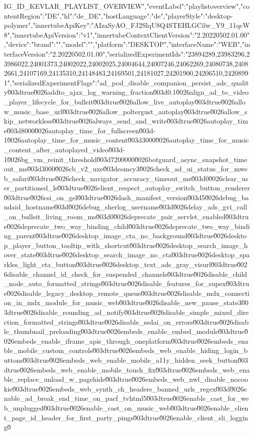 {IG_ID_KEVLAR_PLAYLIST_OVERVIEW","eventLabel":"playlistoverview","contentRegion":"DE","hl":"de_DE","hostLanguage":"de","playerStyle":"desktop-polymer","innertubeApiKey":"AIzaSyAO_FJ2SlqU8Q4STEHLGCilw_Y9_11qcW8","innertubeApiVersion":"v1","innertubeContextClientVersion":"2.20220502.01.00","device":{"brand":"","model":"","platform":"DESKTOP","interfaceName":"WEB","interfaceVersion":"2.20220502.01.00"},"serializedExperimentIds":"23894289,23983296,23986022,24001373,24002022,24002025,24004644,24007246,24062269,24080738,24082661,24107169,24135310,24148483,24169501,24181027,24201900,24206510,24208991","serializedExperimentFlags":"ad_pod_disable_companion_persist_ads_quality\u003dtrue\u0026addto_ajax_log_warning_fraction\u003d0.1\u0026align_ad_to_video_player_lifecycle_for_bulleit\u003dtrue\u0026allow_live_autoplay\u003dtrue\u0026allow_music_base_url\u003dtrue\u0026allow_poltergust_autoplay\u003dtrue\u0026allow_skip_networkless\u003dtrue\u0026always_send_and_write\u003dtrue\u0026autoplay_time\u003d8000\u0026autoplay_time_for_fullscreen\u003d-1\u0026autoplay_time_for_music_content\u003d3000\u0026autoplay_time_for_music_content_after_autoplayed_video\u003d-1\u0026bg_vm_reinit_threshold\u003d7200000\u0026botguard_async_snapshot_timeout_ms\u003d3000\u0026cb_v2_uxe\u003deomcy3\u0026check_ad_ui_status_for_mweb_safari\u003dtrue\u0026check_navigator_accuracy_timeout_ms\u003d0\u0026clear_user_partitioned_ls\u003dtrue\u0026client_respect_autoplay_switch_button_renderer\u003dtrue\u0026csi_on_gel\u003dtrue\u0026dash_manifest_version\u003d5\u0026debug_bandaid_hostname\u003d\u0026debug_sherlog_username\u003d\u0026delay_ads_gvi_call_on_bulleit_living_room_ms\u003d0\u0026deprecate_pair_servlet_enabled\u003dtrue\u0026deprecate_two_way_binding_child\u003dtrue\u0026deprecate_two_way_binding_parent\u003dtrue\u0026desktop_image_cta_no_background\u003dtrue\u0026desktop_player_button_tooltip_with_shortcut\u003dtrue\u0026desktop_search_image_hover_state\u003dtrue\u0026desktop_search_image_no_cta\u003dtrue\u0026desktop_sparkles_light_cta_button\u003dtrue\u0026desktop_text_ads_gray_visurl\u003dtrue\u0026disable_channel_id_check_for_suspended_channels\u003dtrue\u0026disable_child_node_auto_formatted_strings\u003dtrue\u0026disable_features_for_supex\u003dtrue\u0026disable_legacy_desktop_remote_queue\u003dtrue\u0026disable_mdx_connection_in_mdx_module_for_music_web\u003dtrue\u0026disable_new_pause_state3\u003dtrue\u0026disable_rounding_ad_notify\u003dtrue\u0026disable_simple_mixed_direction_formatted_strings\u003dtrue\u0026disable_ssdai_on_errors\u003dtrue\u0026disable_thumbnail_preloading\u003dtrue\u0026embeds_enable_embed_module\u003dtrue\u0026embeds_enable_iframe_apis_through_oneplatform\u003dtrue\u0026embeds_enable_mobile_custom_controls\u003dtrue\u0026embeds_web_enable_hiding_login_buttons\u003dtrue\u0026embeds_web_enable_mobile_a11y_hidden_seek_button\u003dtrue\u0026embeds_web_enable_mobile_touch_fix\u003dtrue\u0026embeds_web_enable_replace_unload_w_pagehide\u003dtrue\u0026embeds_web_nwl_disable_nocookie\u003dtrue\u0026embeds_web_synth_ch_headers_banned_urls_regex\u003d\u0026enable_ad_break_end_time_on_pacf_tvhtml5\u003dtrue\u0026enable_cast_for_web_unplugged\u003dtrue\u0026enable_cast_on_music_web\u003dtrue\u0026enable_client_page_id_header_for_first_party_pings\u003dtrue\u0026enable_client_sli_logging\u0}
